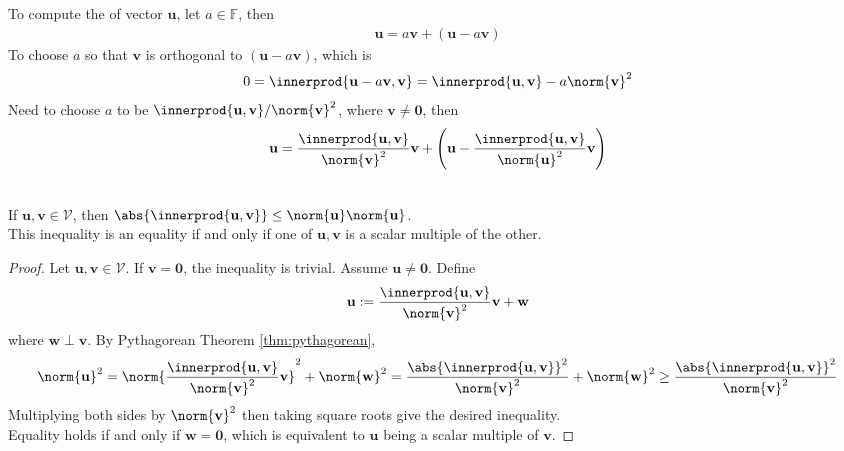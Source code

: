 \begin{definition} To compute the  of vector $\mathbf{u}$, let $a \in \mathbb{F}$, then
\begin{align}
\mathbf{u} = a \mathbf{v} + (\mathbf{u} - a \mathbf{v}) \nonumber
\end{align}
To choose $a$ so that $\mathbf{v}$ is orthogonal to $(\mathbf{u} - a \mathbf{v})$, which is
\begin{align}
0 = \innerprod{\mathbf{u} - a \mathbf{v}, \mathbf{v}} = \innerprod{\mathbf{u}, \mathbf{v}} - a \norm{\mathbf{v}}^2 \nonumber
\end{align}
Need to choose $a$ to be $\innerprod{\mathbf{u}, \mathbf{v}}/\norm{\mathbf{v}}^2$, where $\mathbf{v} \neq \mathbf{0}$, then
\begin{align}
\mathbf{u} = \frac{\innerprod{\mathbf{u}, \mathbf{v}}}{\norm{\mathbf{v}}^2} \mathbf{v} + \left( \mathbf{u} - \frac{\innerprod{\mathbf{u}, \mathbf{v}}}{\norm{\mathbf{u}}^2}\mathbf{v} \right) \nonumber
\end{align}
\end{definition}

\begin{theorem} \label{thm:cauchyschwarzineq} \\
If $\mathbf{u}, \mathbf{v} \in \mathcal{V}$, then $\abs{\innerprod{\mathbf{u}, \mathbf{v}}} \leq \norm{\mathbf{u}} \norm{\mathbf{u}}$.\\
This inequality is an equality if and only if one of $\mathbf{u}, \mathbf{v}$ is a scalar multiple of the other.
\begin{proof} Let $\mathbf{u}, \mathbf{v} \in \mathcal{V}$. If $\mathbf{v} = \mathbf{0}$, the inequality is trivial. Assume $\mathbf{u} \neq \mathbf{0}$. Define
\begin{align}
\mathbf{u} := \frac{\innerprod{\mathbf{u}, \mathbf{v}}}{\norm{\mathbf{v}}^2} \mathbf{v} + \mathbf{w} \nonumber
\end{align}
where $\mathbf{w} \perp \mathbf{v}$. By Pythagorean Theorem \ref{thm:pythagorean},
\begin{align}
\norm{\mathbf{u}}^2 = \norm{\frac{\innerprod{\mathbf{u}, \mathbf{v}}}{\norm{\mathbf{v}}^2} \mathbf{v}}^2 + \norm{\mathbf{w}}^2 = \frac{\abs{\innerprod{\mathbf{u}, \mathbf{v}}}^2}{\norm{\mathbf{v}}^2} + \norm{\mathbf{w}}^2 \geq \frac{\abs{\innerprod{\mathbf{u}, \mathbf{v}}}^2}{\norm{\mathbf{v}}^2} \nonumber
\end{align}
Multiplying both sides by $\norm{\mathbf{v}}^2$ then taking square roots give the desired inequality.\\
Equality holds if and only if $\mathbf{w} = \mathbf{0}$, which is equivalent to $\mathbf{u}$ being a scalar multiple of $\mathbf{v}$.
\end{proof}
\end{theorem}

